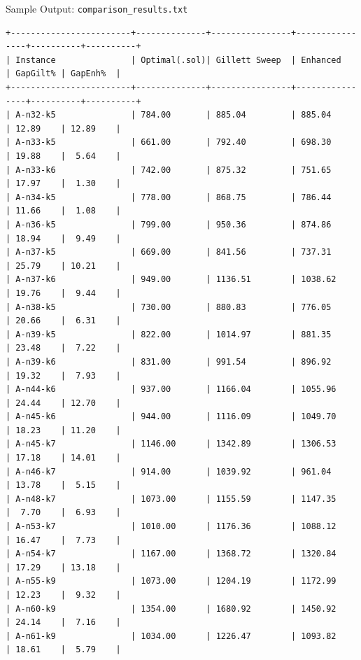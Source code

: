 \documentclass{beamer}
\begin{document}
\begin{frame}[fragile]{Sample Output: \texttt{comparison\_results.txt}}

\begin{lstlisting}[language={},numbers=none,basicstyle=\ttfamily\fontsize{5}{6}\selectfont]
+------------------------+--------------+----------------+----------------+----------+----------+
| Instance               | Optimal(.sol)| Gillett Sweep  | Enhanced       | GapGilt% | GapEnh%  |
+------------------------+--------------+----------------+----------------+----------+----------+
| A-n32-k5               | 784.00       | 885.04         | 885.04         | 12.89    | 12.89    |
| A-n33-k5               | 661.00       | 792.40         | 698.30         | 19.88    |  5.64    |
| A-n33-k6               | 742.00       | 875.32         | 751.65         | 17.97    |  1.30    |
| A-n34-k5               | 778.00       | 868.75         | 786.44         | 11.66    |  1.08    |
| A-n36-k5               | 799.00       | 950.36         | 874.86         | 18.94    |  9.49    |
| A-n37-k5               | 669.00       | 841.56         | 737.31         | 25.79    | 10.21    |
| A-n37-k6               | 949.00       | 1136.51        | 1038.62        | 19.76    |  9.44    |
| A-n38-k5               | 730.00       | 880.83         | 776.05         | 20.66    |  6.31    |
| A-n39-k5               | 822.00       | 1014.97        | 881.35         | 23.48    |  7.22    |
| A-n39-k6               | 831.00       | 991.54         | 896.92         | 19.32    |  7.93    |
| A-n44-k6               | 937.00       | 1166.04        | 1055.96        | 24.44    | 12.70    |
| A-n45-k6               | 944.00       | 1116.09        | 1049.70        | 18.23    | 11.20    |
| A-n45-k7               | 1146.00      | 1342.89        | 1306.53        | 17.18    | 14.01    |
| A-n46-k7               | 914.00       | 1039.92        | 961.04         | 13.78    |  5.15    |
| A-n48-k7               | 1073.00      | 1155.59        | 1147.35        |  7.70    |  6.93    |
| A-n53-k7               | 1010.00      | 1176.36        | 1088.12        | 16.47    |  7.73    |
| A-n54-k7               | 1167.00      | 1368.72        | 1320.84        | 17.29    | 13.18    |
| A-n55-k9               | 1073.00      | 1204.19        | 1172.99        | 12.23    |  9.32    |
| A-n60-k9               | 1354.00      | 1680.92        | 1450.92        | 24.14    |  7.16    |
| A-n61-k9               | 1034.00      | 1226.47        | 1093.82        | 18.61    |  5.79    |

\end{lstlisting}
\end{frame}
\end{document}
